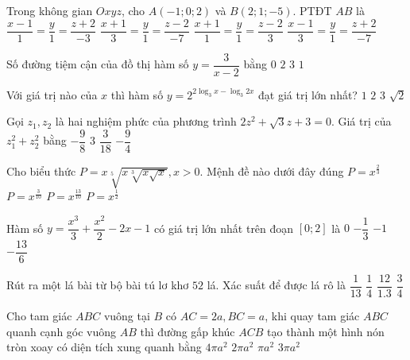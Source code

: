 \begin{ex}%
Trong không gian $Oxyz$, cho $A(-1; 0; 2)$ và $B(2; 1;-5)$. PTĐT $AB$ là
\choice
{$\dfrac{x-1}{1}=\dfrac{y}{1}=\dfrac{z+2}{-3}$}
{\True $\dfrac{x+1}{3}=\dfrac{y}{1}=\dfrac{z-2}{-7}$}
{$\dfrac{x+1}{1}=\dfrac{y}{1}=\dfrac{z-2}{3}$}
{$\dfrac{x-1}{3}=\dfrac{y}{1}=\dfrac{z+2}{-7}$}

\end{ex}
\begin{ex}%
Số đường tiệm cận của đồ thị hàm số $y=\dfrac{3}{x-2}$ bằng
\choice
{$0$}
{\True $2$}
{$3$}
{$1$}

\end{ex}
\begin{ex}%
Với giá trị nào của $x$ thì hàm số $y=2^{2\log_3 x-\log_3 2 x}$ đạt giá trị lớn nhất?
\choice
{$1$}
{$2$}
{\True $3$}
{$\sqrt{2}$}

\end{ex}
\begin{ex}%
Gọi $z_1, z_2$ là hai nghiệm phức của phương trình $2 z^2+\sqrt{3} z+3=0$. Giá trị của $z_1^2+z_2^2$ bằng
\choice
{$-\dfrac{9}{8}$}
{$3$}
{$\dfrac{3}{18}$}
{\True $-\dfrac{9}{4}$}

\end{ex}
\begin{ex}%
Cho biểu thức $P=x \sqrt[5]{x \sqrt[3]{x \sqrt{x}}}, x>0$. Mệnh đề nào dưới đây đúng
\choice
{$P=x^{\frac{2}{3}}$}
{$P=x^{\frac{3}{10}}$}
{\True $P=x^{\frac{13}{10}}$}
{$P=x^{\frac{1}{2}}$}

\end{ex}
\begin{ex}%
Hàm số $y=\dfrac{x^3}{3}+\dfrac{x^2}{2}-2 x-1$ có giá trị lớn nhất trên đoạn $[0; 2]$ là
\choice
{$0$}
{\True $-\dfrac{1}{3}$}
{$-1$}
{$-\dfrac{13}{6}$}

\end{ex}
\begin{ex}%
Rút ra một lá bài từ bộ bài tú lơ khơ $52$ lá. Xác suất để được lá rô là
{$\dfrac{1}{13}$}
{\True  $\dfrac{1}{4}$}
{ $\dfrac{12}{1.3}$}
{ $\dfrac{3}{4}$}

\end{ex}
\begin{ex}%
Cho tam giác $ABC$ vuông tại $B$ có $AC=2 a, BC=a$, khi quay tam giác $ABC$ quanh cạnh góc vuông $AB$ thì đường gấp khúc $ACB$ tạo thành một hình nón tròn xoay có diện tích xung quanh bằng
\choice
{$4\pi a^2$}
{\True $2\pi a^2$}
{$\pi a^2$}
{$3\pi a^2$}

\end{ex}
